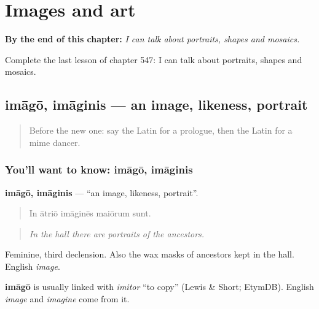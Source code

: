 
\chapter{Images and art}
\label{ch:la-images-and-art}

\begin{chapteropening}
\textbf{By the end of this chapter:} \emph{I can talk about portraits, shapes and mosaics.}

Complete the last lesson of chapter 547: I can talk about portraits, shapes and mosaics.
\end{chapteropening}

\section[imāgō, imāginis]{imāgō, imāginis — an image, likeness, portrait}

\label{lesson:LA-C547-imago}



\begin{quote}
Before the new one: say the Latin for a prologue, then the Latin for a mime dancer.
\end{quote}

\subsection*{You'll want to know: imāgō, imāginis}
\textbf{imāgō, imāginis} — \textquotedblleft{}an image, likeness, portrait\textquotedblright{}.

\begin{quote}
In ātriō imāginēs maiōrum sunt.
\end{quote}

\begin{quote}
\emph{In the hall there are portraits of the ancestors.}
\end{quote}

Feminine, third declension. Also the wax masks of ancestors kept in the hall. English \emph{image}.

\begin{cousinweb}
\textbf{imāgō} is usually linked with \emph{imitor} \textquotedblleft{}to copy\textquotedblright{} (Lewis \& Short; EtymDB). English \emph{image} and \emph{imagine} come from it.
\end{cousinweb}

